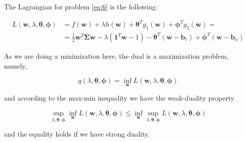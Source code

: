 \documentclass{beamer}
\begin{document}
\begin{frame}

\justifying
The Lagrangian for problem \eqref{eq:6} is the following:

\justifying
\begin{equation*}
\begin{aligned}
	L\left(\mathbf{w},\lambda,\boldsymbol\theta,\boldsymbol\phi\right) & = f\left(\mathbf{w}\right) + \lambda h\left(\mathbf{w}\right) + \boldsymbol\theta^{T} g_{1}\left(\mathbf{w}\right) + \boldsymbol\phi^{T} g_{2}\left(\mathbf{w}\right) = \\
	& = \frac{1}{2}\mathbf{w}^{T}\mathbf{\Sigma}\mathbf{w} - \lambda \left(\mathbf{1}^{T} \mathbf{w} - 1\right) - \boldsymbol\theta^{T} \left( \mathbf{w}-\mathbf{b}_{\ell} \right) + \boldsymbol\phi^{T} \left( \mathbf{w}-\mathbf{b}_{u} \right)
\end{aligned}
\end{equation*}

\vspace{0.2cm}
\justifying
As we are doing a minimization here, the dual is a maximization problem, namely,

\justifying
\begin{equation*}
	q \left(\lambda, \boldsymbol\theta, \boldsymbol\phi \right) = \inf_{\mathbf{w}} L\left(\mathbf{w},\lambda,\boldsymbol\theta,\boldsymbol\phi\right)
\end{equation*}

\vspace{0.2cm}
\justifying
and according to the max-min inequality we have the weak-duality property

\justifying
\begin{equation*}
	\sup_{\lambda, \boldsymbol\theta, \boldsymbol\phi} \inf_{\mathbf{w}} L\left(\mathbf{w},\lambda,\boldsymbol\theta,\boldsymbol\phi\right) \leq \inf_{\mathbf{w}} \sup_{\lambda, \boldsymbol\theta, \boldsymbol\phi} L\left(\mathbf{w},\lambda,\boldsymbol\theta,\boldsymbol\phi\right)
\end{equation*}

\vspace{0.2cm}
\justifying
and the equality holds if we have strong duality. 

\end{frame}
\end{document}
